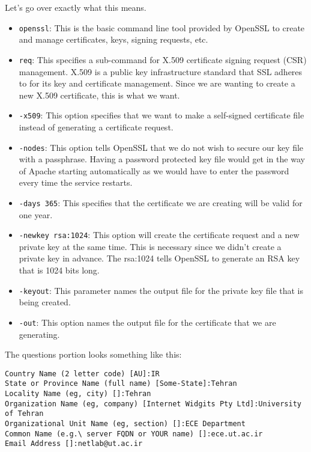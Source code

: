 \documentclass{../UTNetLab}
\begin{document}
        Let's go over exactly what this means.

        \begin{itemize}
            \item \lstinline{openssl}: This is the basic command line tool provided by OpenSSL to create and manage certificates, keys, signing requests, etc.
            \item \lstinline{req}: This specifies a sub-command for X.509 certificate signing request (CSR) management. X.509 is a public key infrastructure standard that SSL adheres to for its key and certificate management. Since we are wanting to create a new X.509 certificate, this is what we want.
            \item \lstinline{-x509}: This option specifies that we want to make a self-signed certificate file instead of generating a certificate request.
            \item \lstinline{-nodes}: This option tells OpenSSL that we do not wish to secure our key file with a passphrase. Having a password protected key file would get in the way of Apache starting automatically as we would have to enter the password every time the service restarts.
            \item \lstinline{-days 365}: This specifies that the certificate we are creating will be valid for one year.
            \item \lstinline{-newkey rsa:1024}: This option will create the certificate request and a new private key at the same time. This is necessary since we didn't create a private key in advance. The rsa:1024 tells OpenSSL to generate an RSA key that is 1024 bits long.
            \item \lstinline{-keyout}: This parameter names the output file for the private key file that is being created.
            \item \lstinline{-out}: This option names the output file for the certificate that we are generating.    
        \end{itemize}

    The questions portion looks something like this:
    {\small
    \begin{verbatim}
Country Name (2 letter code) [AU]:IR 
State or Province Name (full name) [Some-State]:Tehran 
Locality Name (eg, city) []:Tehran 
Organization Name (eg, company) [Internet Widgits Pty Ltd]:University of Tehran 
Organizational Unit Name (eg, section) []:ECE Department 
Common Name (e.g.\ server FQDN or YOUR name) []:ece.ut.ac.ir 
Email Address []:netlab@ut.ac.ir 
    \end{verbatim}}
\end{document}
